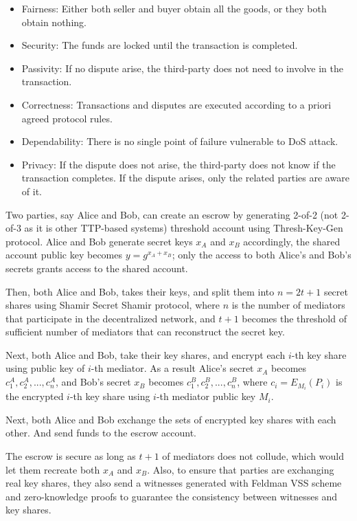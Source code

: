 \documentclass{ieeeaccess}
\begin{document}
\begin{itemize}
    \item Fairness: Either both seller and buyer obtain all the goods, or they both obtain nothing.
    \item Security: The funds are locked until the transaction is completed.
    \item Passivity: If no dispute arise, the third-party does not need to involve in the transaction.
    \item Correctness: Transactions and disputes are executed according to a priori agreed protocol rules.
    \item Dependability: There is no single point of failure vulnerable to DoS attack.
    \item Privacy: If the dispute does not arise, the third-party does not know if the transaction completes. If the dispute arises, only the related parties are aware of it.    
\end{itemize}

Two parties, say Alice and Bob, can create an escrow by generating
2-of-2 (not 2-of-3 as it is other TTP-based systems) threshold account
using Thresh-Key-Gen protocol. Alice and Bob generate secret keys
\(x_A\) and \(x_B\) accordingly, the shared account public key becomes
\(y = g^{x_A+x_B}\); only the access to both Alice's and Bob's secrets
grants access to the shared account.

Then, both Alice and Bob, takes their keys, and split them into
\(n=2t+1\) secret shares using Shamir Secret Shamir protocol, where
\(n\) is the number of mediators that participate in the decentralized
network, and \(t+1\) becomes the threshold of sufficient number of
mediators that can reconstruct the secret key.

Next, both Alice and Bob, take their key shares, and encrypt each
\(i\)-th key share using public key of \(i\)-th mediator. As a result
Alice's secret \(x_A\) becomes \({c^A_1, c^A_2,...,c^A_n}\), and Bob's
secret \(x_B\) becomes \({c^B_1, c^B_2,...,c^B_n}\), where
\(c_i = E_{M_i}(P_i)\) is the encrypted \(i\)-th key share using
\(i\)-th mediator public key \(M_i\).

Next, both Alice and Bob exchange the sets of encrypted key shares with
each other. And send funds to the escrow account.

The escrow is secure as long as \(t+1\) of mediators does not collude,
which would let them recreate both \(x_A\) and \(x_B\). Also, to ensure
that parties are exchanging real key shares, they also send a witnesses
generated with Feldman VSS scheme and zero-knowledge proofs to guarantee
the consistency between witnesses and key shares.
\end{document}
